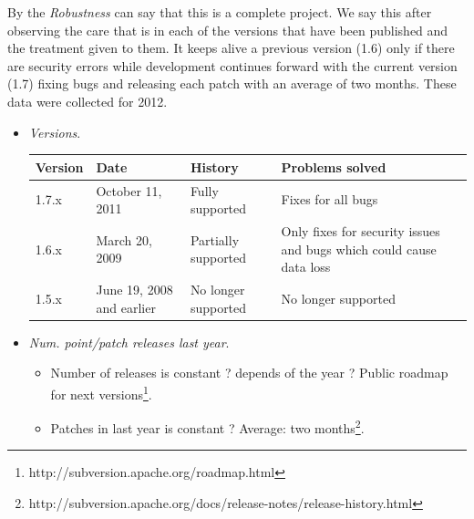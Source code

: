 \documentclass[11pt]{scrartcl}
\begin{document}
\par By the \emph{Robustness} can say that this is a complete project. We say this after observing the care that is in each of the versions that have been published and the treatment given to them. It keeps alive a previous version (1.6) only if there are security errors while development continues forward with the current version (1.7) fixing bugs and releasing each patch with an average of two months. These data were collected for 2012.

\begin{itemize}
    \item \emph{Versions}.

        \begin{table}[H]
        \centering
        \begin{tabular}{p{1cm} p{3cm} p{4cm} p{4cm}}
            \hline
                {\bf Version} & {\bf Date} & {\bf History} & {\bf Problems solved}\\
            \hline
                1.7.x & October 11, 2011 & Fully supported & Fixes for all bugs\\
            \hline
                1.6.x & March 20, 2009 & Partially supported & Only fixes for security issues and bugs which could cause data loss\\
            \hline
                1.5.x & June 19, 2008 and earlier & No longer supported & No longer supported\\
            \hline
        \end{tabular}
        \end{table}
    \item \emph{Num. point/patch releases last year}.
    \begin{itemize}
        \item Number of releases is constant ? depends of the year ? Public roadmap for next versions\footnote{http://subversion.apache.org/roadmap.html}.
        \item Patches in last year is constant ? Average: two months\footnote{http://subversion.apache.org/docs/release-notes/release-history.html}.


\end{itemize}
\end{itemize}
\end{document}

